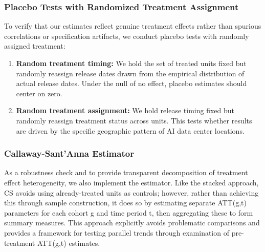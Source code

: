 \documentclass[a4paper,fleqn,longmktitle]{cas-sc}
\newcommand{\nb}[1]{\textcolor{blue}{NB[#1]}}
\begin{document}
\subsubsection{Placebo Tests with Randomized Treatment Assignment}

To verify that our estimates reflect genuine treatment effects rather than spurious correlations or specification artifacts, we conduct placebo tests with randomly assigned treatment:
\begin{enumerate}
    \item \textbf{Random treatment timing:} We hold the set of treated units fixed but randomly reassign release dates drawn from the empirical distribution of actual release dates. Under the null of no effect, placebo estimates should center on zero.
    \item \textbf{Random treatment assignment:} We hold release timing fixed but randomly reassign treatment status across units. This tests whether results are driven by the specific geographic pattern of AI data center locations.
\end{enumerate}

\subsubsection{Callaway-Sant'Anna Estimator}

As a robustness check and to provide transparent decomposition of treatment effect heterogeneity, we also implement the \citet{callaway2021difference} estimator. Like the stacked approach, CS avoids using already-treated units as controls; however, rather than achieving this through sample construction, it does so by estimating separate ATT(g,t) parameters for each cohort g and time period t, then aggregating these to form summary measures. This approach explicitly avoids problematic comparisons and provides a framework for testing parallel trends through examination of pre-treatment ATT(g,t) estimates. 
\end{document}
